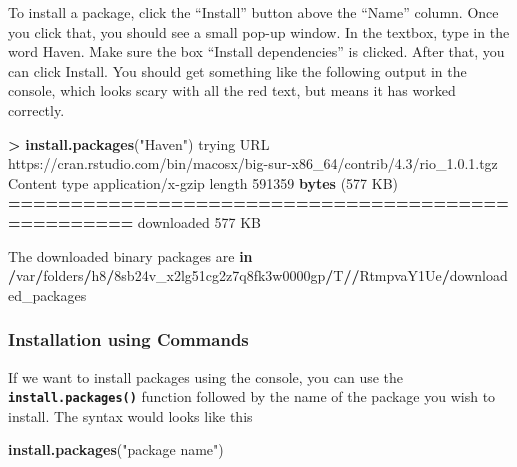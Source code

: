 \documentclass[
]{book}
\newenvironment{Shaded}{\begin{snugshade}}{\end{snugshade}}
\newcommand{\ControlFlowTok}[1]{\textcolor[rgb]{0.13,0.29,0.53}{\textbf{#1}}}
\newcommand{\DecValTok}[1]{\textcolor[rgb]{0.00,0.00,0.81}{#1}}
\newcommand{\ErrorTok}[1]{\textcolor[rgb]{0.64,0.00,0.00}{\textbf{#1}}}
\newcommand{\FunctionTok}[1]{\textcolor[rgb]{0.13,0.29,0.53}{\textbf{#1}}}
\newcommand{\NormalTok}[1]{#1}
\newcommand{\SpecialCharTok}[1]{\textcolor[rgb]{0.81,0.36,0.00}{\textbf{#1}}}
\newcommand{\StringTok}[1]{\textcolor[rgb]{0.31,0.60,0.02}{#1}}
\begin{document}
To install a package, click the ``Install'' button above the ``Name'' column. Once you click that, you should see a small pop-up window. In the textbox, type in the word Haven. Make sure the box ``Install dependencies'' is clicked. After that, you can click Install. You should get something like the following output in the console, which looks scary with all the red text, but means it has worked correctly.

\begin{Shaded}
\begin{Highlighting}[]
\SpecialCharTok{\textgreater{}} \FunctionTok{install.packages}\NormalTok{(}\StringTok{"Haven"}\NormalTok{)}
\NormalTok{trying URL }\StringTok{\textquotesingle{}https://cran.rstudio.com/bin/macosx/big{-}sur{-}x86\_64/contrib/4.3/rio\_1.0.1.tgz\textquotesingle{}}
\NormalTok{Content type }\StringTok{\textquotesingle{}application/x{-}gzip\textquotesingle{}}\NormalTok{ length }\DecValTok{591359} \FunctionTok{bytes}\NormalTok{ (}\DecValTok{577}\NormalTok{ KB)}
\SpecialCharTok{==}\ErrorTok{================================================}
\NormalTok{downloaded }\DecValTok{577}\NormalTok{ KB}


\NormalTok{The downloaded binary packages are }\ControlFlowTok{in}
    \SpecialCharTok{/}\NormalTok{var}\SpecialCharTok{/}\NormalTok{folders}\SpecialCharTok{/}\NormalTok{h8}\SpecialCharTok{/}\NormalTok{8sb24v\_x2lg51cg2z7q8fk3w0000gp}\SpecialCharTok{/}\NormalTok{T}\SpecialCharTok{/}\ErrorTok{/}\NormalTok{RtmpvaY1Ue}\SpecialCharTok{/}\NormalTok{downloaded\_packages}
\end{Highlighting}
\end{Shaded}

\hypertarget{installation-using-commands}{%
\subsubsection{Installation using Commands}\label{installation-using-commands}}

If we want to install packages using the console, you can use the \textbf{\texttt{install.packages()}} function followed by the name of the package you wish to install. The syntax would looks like this

\begin{Shaded}
\begin{Highlighting}[]
\FunctionTok{install.packages}\NormalTok{(}\StringTok{"package name"}\NormalTok{)}
\end{Highlighting}
\end{Shaded}
\end{document}
